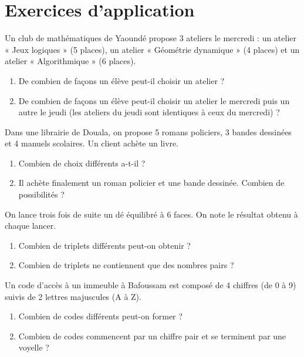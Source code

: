 \section{Exercices d'application}


\exo{}
Un club de mathématiques de Yaoundé propose 3 ateliers le mercredi : un atelier « Jeux logiques » (5 places), un atelier « Géométrie dynamique » (4 places) et un atelier « Algorithmique » (6 places). 
\begin{enumerate}[label=\alph*)]
    \item De combien de façons un élève peut-il choisir un atelier ?
    \item De combien de façons un élève peut-il choisir un atelier le mercredi puis un autre le jeudi (les ateliers du jeudi sont identiques à ceux du mercredi) ?
\end{enumerate}

\exo{}
Dans une librairie de Douala, on propose 5 romans policiers, 3 bandes dessinées et 4 manuels scolaires. Un client achète un livre.
\begin{enumerate}[label=\alph*)]
    \item Combien de choix différents a-t-il ?
    \item Il achète finalement un roman policier et une bande dessinée. Combien de possibilités ?
\end{enumerate}


\exo{}
On lance trois fois de suite un dé équilibré à 6 faces. On note le résultat obtenu à chaque lancer.
\begin{enumerate}[label=\alph*)]
    \item Combien de triplets différents peut-on obtenir ?
    \item Combien de triplets ne contiennent que des nombres pairs ?
\end{enumerate}

\exo{}
Un code d'accès à un immeuble à Bafoussam est composé de 4 chiffres (de 0 à 9) suivis de 2 lettres majuscules (A à Z). 
\begin{enumerate}[label=\alph*)]
    \item Combien de codes différents peut-on former ?
    \item Combien de codes commencent par un chiffre pair et se terminent par une voyelle ?
\end{enumerate}

